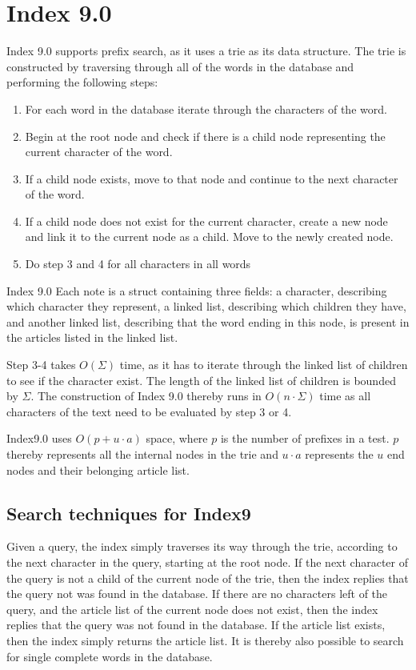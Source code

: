 \section{Index 9.0}
Index 9.0 supports prefix search, as it uses a trie as its data structure. The trie is constructed by traversing through all of the words in the database and performing the following steps:

\begin{enumerate}
  \item For each word in the database iterate through the characters of the word.
  \item Begin at the root node and check if there is a child node representing the current character of the word. 
  \item If a child node exists, move to that node and continue to the next character of the word.
  \item If a child node does not exist for the current character, create a new node and link it to the current node as a child. Move to the newly created node.
  \item Do step 3 and 4 for all characters in all words
\end{enumerate}

Index 9.0 Each note is a struct containing three fields: a character, describing which character they represent, a linked list, describing which children they have, and another linked list, describing that the word ending in this node, is present in the articles listed in the linked list.

Step 3-4 takes $O(\Sigma)$ time, as it has to iterate through the linked list of children to see if the character exist. The length of the linked list of children is bounded by $\Sigma$. The construction of Index 9.0 thereby runs in $O(n\cdot \Sigma)$ time as all characters of the text need to be evaluated by step 3 or 4.

Index9.0 uses $O(p + u\cdot a)$ space, where $p$ is the number of prefixes in a test. $p$ thereby represents all the internal nodes in the trie and $ u\cdot a$ represents the $u$ end nodes and their belonging article list.

\subsection{Search techniques for Index9}
Given a query, the index simply traverses its way through the trie, according to the next character in the query, starting at the root node. If the next character of the query is not a child of the current node of the trie, then the index replies that the query not was found in the database. If there are no characters left of the query, and the article list of the current node does not exist, then the index replies that the query was not found in the database. If the article list exists, then the index simply returns the article list. It is thereby also possible to search for single complete words in the database.


